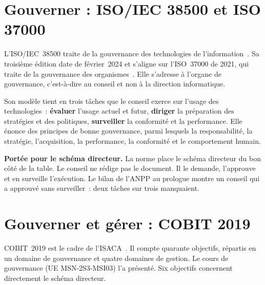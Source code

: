 \section{Gouverner : ISO/IEC 38500 et ISO 37000}
\label{sec:c04-38500}

L'ISO/IEC~38500 traite de la gouvernance des technologies de l'information~\cite{iso38500}. Sa troisième édition
date de février~2024 et s'aligne sur l'ISO~37000 de 2021, qui traite de la gouvernance des
organismes~\cite{iso37000}. Elle s'adresse à l'organe de gouvernance, c'est-à-dire au conseil et non à la
direction informatique.

Son modèle tient en trois tâches que le conseil exerce sur l'usage des technologies~: \textbf{évaluer} l'usage
actuel et futur, \textbf{diriger} la préparation des stratégies et des politiques, \textbf{surveiller} la
conformité et la performance. Elle énonce des principes de bonne gouvernance, parmi lesquels la responsabilité,
la stratégie, l'acquisition, la performance, la conformité et le comportement humain.

\begin{boxinfo}
\textbf{Portée pour le schéma directeur.} La norme place le schéma directeur du bon côté de la table. Le conseil
ne rédige pas le document. Il le demande, l'approuve et en surveille l'exécution. Le bilan de l'ANPP au prologue
montre un conseil qui a approuvé sans surveiller~: deux tâches sur trois manquaient.
\end{boxinfo}

\section{Gouverner et gérer : COBIT 2019}
\label{sec:c04-cobit}

COBIT~2019 est le cadre de l'ISACA~\cite{cobit2019}. Il compte quarante objectifs, répartis en un domaine de
gouvernance et quatre domaines de gestion. Le cours de gouvernance (UE MSN-2S3-MSI03) l'a présenté. Six
objectifs concernent directement le schéma directeur.

